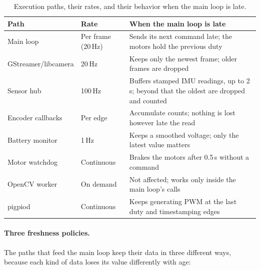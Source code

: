 \begin{table}[H]
      \centering
      \caption{Execution paths, their rates, and their behavior when the main
            loop is late.}
      \label{tab:execution-paths}
      \small
      \begin{tabularx}{\textwidth}{@{}llX@{}}
            \toprule
            \textbf{Path}       & \textbf{Rate}      & \textbf{When the main loop is late}                                                      \\
            \midrule
            Main loop           & Per frame (20\,Hz) & Sends its next command late; the motors hold the previous duty                           \\
            GStreamer/libcamera & 20\,Hz             & Keeps only the newest frame; older frames are dropped                                    \\
            Sensor hub          & 100\,Hz            & Buffers stamped IMU readings, up to 2\,s; beyond that the oldest are dropped and counted \\
            Encoder callbacks   & Per edge           & Accumulate counts; nothing is lost however late the read                                 \\
            Battery monitor     & 1\,Hz              & Keeps a smoothed voltage; only the latest value matters                                  \\
            Motor watchdog      & Continuous         & Brakes the motors after 0.5\,s without a command                                         \\
            OpenCV worker       & On demand          & Not affected; works only inside the main loop's calls                                    \\
            pigpiod             & Continuous         & Keeps generating PWM at the last duty and timestamping edges                             \\
            \bottomrule
      \end{tabularx}
\end{table}

\paragraph{Three freshness policies.}
The paths that feed the main loop keep their data in three different ways,
because each kind of data loses its value differently with age:

